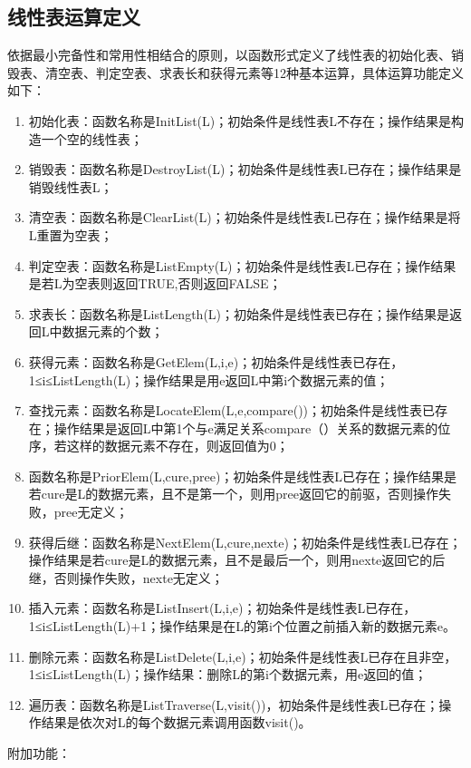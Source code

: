 \documentclass[supercite]{Experimental_Report}
\theoremstyle{definition}
\begin{document}
	\subsection{线性表运算定义}
	依据最小完备性和常用性相结合的原则，以函数形式定义了线性表的初始化表、销毁表、清空表、判定空表、求表长和获得元素等12种基本运算，具体运算功能定义如下：
	\begin{enumerate}
		\item	初始化表：函数名称是InitList(L)；初始条件是线性表L不存在；操作结果是构造一个空的线性表；
		\item	销毁表：函数名称是DestroyList(L)；初始条件是线性表L已存在；操作结果是销毁线性表L；
		\item	清空表：函数名称是ClearList(L)；初始条件是线性表L已存在；操作结果是将L重置为空表；
		\item	判定空表：函数名称是ListEmpty(L)；初始条件是线性表L已存在；操作结果是若L为空表则返回TRUE,否则返回FALSE；
		\item	求表长：函数名称是ListLength(L)；初始条件是线性表已存在；操作结果是返回L中数据元素的个数；
		\item	获得元素：函数名称是GetElem(L,i,e)；初始条件是线性表已存在，1≤i≤ListLength(L)；操作结果是用e返回L中第i个数据元素的值；
		\item	查找元素：函数名称是LocateElem(L,e,compare())；初始条件是线性表已存在；操作结果是返回L中第1个与e满足关系compare（）关系的数据元素的位序，若这样的数据元素不存在，则返回值为0；
		\item	函数名称是PriorElem(L,cure,pree)；初始条件是线性表L已存在；操作结果是若cure是L的数据元素，且不是第一个，则用pree返回它的前驱，否则操作失败，pree无定义；
		\item	获得后继：函数名称是NextElem(L,cure,nexte)；初始条件是线性表L已存在；操作结果是若cure是L的数据元素，且不是最后一个，则用nexte返回它的后继，否则操作失败，nexte无定义；
		\item	插入元素：函数名称是ListInsert(L,i,e)；初始条件是线性表L已存在，1≤i≤ListLength(L)+1；操作结果是在L的第i个位置之前插入新的数据元素e。
		\item	删除元素：函数名称是ListDelete(L,i,e)；初始条件是线性表L已存在且非空，1≤i≤ListLength(L)；操作结果：删除L的第i个数据元素，用e返回的值；
		\item	遍历表：函数名称是ListTraverse(L,visit())，初始条件是线性表L已存在；操作结果是依次对L的每个数据元素调用函数visit()。
		
	\end{enumerate}
	附加功能：
\end{document}
